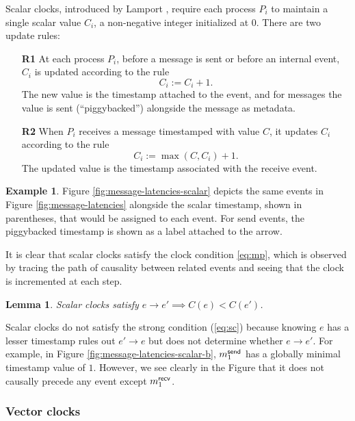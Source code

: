 \documentclass[]             %
{NASA}                       %
\newtheorem{lemma}[theorem]{Lemma}
\theoremstyle{definition}
\newtheorem{example}{Example}[section]
\begin{document}
Scalar clocks, introduced by Lamport \cite{1978:lamportclocks},
require each process $P_i$ to maintain a single scalar value $C_i$, a
non-negative integer initialized at $0$. There are two update rules:
\begin{enumerate}
\item[\textbf{R1}] At each process $P_i$, before a message is sent or
  before an internal event, $C_i$ is updated according to the rule
  \[C_i := C_i + 1.\] The new value is the timestamp attached to the
  event, and for messages the value is sent (``piggybacked'')
  alongside the message as metadata.
\item[\textbf{R2}] When $P_i$ receives a message timestamped with value $C$, it
  updates $C_i$ according to the rule
  \[C_i := \max(C, C_i) + 1.\]
  The updated value is the timestamp associated with the receive
  event.
\end{enumerate}

\begin{example}
Figure \ref{fig:message-latencies-scalar} depicts the same events in
Figure \ref{fig:message-latencies} alongside the scalar timestamp,
shown in parentheses, that would be assigned to each event. For send
events, the piggybacked timestamp is shown as a label attached to the
arrow.
\end{example}

It is clear that scalar clocks satisfy the clock condition
\eqref{eq:mp}, which is observed by tracing the path of causality
between related events and seeing that the clock is incremented at
each step.
\begin{lemma}
  Scalar clocks satisfy $e \to e' \implies C(e) < C(e')$.
\end{lemma}

Scalar clocks do not satisfy the strong condition (\ref{eq:sc})
because knowing $e$ has a lesser timestamp rules out $e' \to e$ but
does not determine whether $e \to e'$. For example, in Figure
\ref{fig:message-latencies-scalar-b}, $m_{1}^{\mathsf{send}}$ has a globally
minimal timestamp value of $1$. However, we see clearly in the Figure
that it does not causally precede any event except $m_{1}^{\mathsf{recv}}$.

\subsubsection{Vector clocks}
\label{sssec:vector-clocks}
\newcommand{\vt}{\textrm{vt}}
\end{document}
